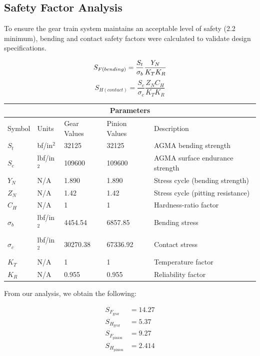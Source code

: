 \documentclass[letterpaper,12pt]{article}
\begin{document}
\subsection{Safety Factor Analysis}
To ensure the gear train system maintains an acceptable level of safety (2.2 minimum), bending and contact safety factors were calculated to validate design specifications.

\begin{equation}
S_{F(bending)} = \frac{S_t}{\sigma_b}\frac{Y_N}{K_T K_R} \\
\end{equation}
\begin{equation}
S_{H(contact)} = \frac{S_c}{\sigma_c}\frac{Z_N C_H}{K_T K_R}
\end{equation}

\begin{center}
	\begin{tabular}{ |p{2cm}||p{2cm}|p{2.3cm}|p{2.3cm}|p{6cm}|  }
		\hline
		\multicolumn{5}{|c|}{Parameters} \\
		\hline
		Symbol & Units & Gear Values & Pinion Values & Description\\
		\hline
		$S_t$ & bf/in$^2$ & 32125 & 32125 & AGMA bending strength\\
		$S_c$ & lbf/in$^2$ & 109600 & 109600 & AGMA surface endurance strength\\
		$Y_N$ & N/A & 1.890 & 1.890 & Stress cycle (bending strength)\\
		$Z_N$ & N/A & 1.42 & 1.42 & Stress cycle (pitting resistance)\\
		$C_H$ & N/A & 1 & 1 & Hardness-ratio factor\\
		$\sigma_b$ & lbf/in$^2$ & 4454.54 & 6857.85 & Bending stress\\
		$\sigma_c$ & lbf/in$^2$ & 30270.38 & 67336.92 & Contact stress\\
		$K_T$ & N/A & 1 & 1 & Temperature factor\\
		$K_R$ & N/A & 0.955 & 0.955 & Reliability factor\\
		\hline
	\end{tabular}
\end{center}

\noindent From our analysis, we obtain the following: 

\begin{align*}
    S_F_{\text{gear}} &= 14.27 \\
    S_H_{\text{gear}} &= 5.37 \\
    S_F_{\text{pinion}} &= 9.27 \\
    S_H_{\text{pinion}} &= 2.414
\end{align*}
\end{document}
